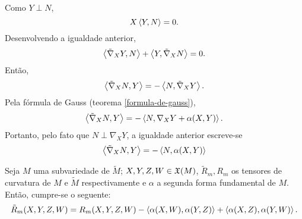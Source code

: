 \begin{demonstracao}
	Como $Y \perp N$,
	\begin{equation*}
		X \left\langle Y,N \right\rangle = 0.
	\end{equation*}
	Desenvolvendo a igualdade anterior,
	\begin{equation*}
		\left\langle \tilde{\nabla}_X Y,N \right\rangle + \left\langle Y,\tilde{\nabla}_X N \right\rangle = 0.
	\end{equation*}
	Então,
	\begin{equation*}
		\left\langle \tilde{\nabla}_X N,Y \right\rangle = -\left\langle N,\tilde{\nabla}_X Y \right\rangle.
	\end{equation*}
	Pela fórmula de Gauss (teorema \ref{formula-de-gauss}),
	\begin{equation*}
		\left\langle \tilde{\nabla}_X N,Y \right\rangle = - \left\langle N,\nabla_X Y + \alpha(X,Y) \right\rangle.
	\end{equation*}
	Portanto, pelo fato que $N \perp \nabla_X Y$, a igualdade anterior escreve-se
	\begin{equation*}
		\left\langle \tilde{\nabla}_X N,Y \right\rangle = - \left\langle N,\alpha(X,Y) \right\rangle
	\end{equation*}
\end{demonstracao}

\begin{teorema}\label{equacao-de-gauss}
	Seja $M$ uma subvariedade de $\tilde{M}$;
	$X,Y,Z,W \in \mathfrak{X}(M)$,
	$\tilde{R}_m, R_m$ os tensores de curvatura de $M$ e $\tilde{M}$ respectivamente e
	$\alpha$ a segunda forma fundamental de $M$.
	Então, cumpre-se o seguente:
	\begin{equation*}
		\tilde{R}_m(X,Y,Z,W) = R_m(X,Y,Z,W) - \left\langle \alpha(X,W),\alpha(Y,Z) \right\rangle + \left\langle \alpha(X,Z),\alpha(Y,W) \right\rangle.
	\end{equation*}
\end{teorema}


